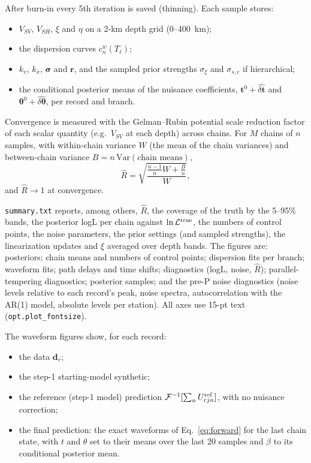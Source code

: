 \documentclass[11pt]{article}
\newcommand{\Ifft}{\mathcal{F}^{-1}}
\newcommand{\vsv}{V_{SV}}
\newcommand{\vsh}{V_{SH}}
\begin{document}
After burn-in every 5th iteration is saved (thinning). Each sample stores:
\begin{itemize}
\item $\vsv$, $\vsh$, $\xi$ and $\eta$ on a 2-km depth grid (0--400~km);
\item the dispersion curves $c^w_n(T_\ell)$;
\item $k_v$, $k_x$, $\bm\sigma$ and $\mathbf{r}$, and the sampled prior
  strengths $\sigma_\xi$ and $\sigma_{s,c}$ if hierarchical;
\item the conditional posterior means of the nuisance coefficients,
  $\mathbf{t}^0+\widehat{\delta\mathbf{t}}$ and
  $\bm\theta^0+\widehat{\delta\bm\theta}$, per record and branch.
\end{itemize}
Convergence is measured with the Gelman--Rubin potential scale reduction
factor of each scalar quantity (e.g.\ $\vsv$ at each depth) across chains.
For $M$ chains of $n$ samples, with within-chain variance $W$ (the mean of
the chain variances) and between-chain variance $B=n\,\mathrm{Var}(\text{chain means})$,
\begin{equation}
 \hat R=\sqrt{\frac{\frac{n-1}{n}W+\frac{B}{n}}{W}},
\end{equation}
and $\hat R\to1$ at convergence.

\texttt{summary.txt} reports, among others, $\hat R$, the coverage of the
truth by the 5--95\% bands, the posterior logL per chain against
$\ln\mathcal{L}^{\rm true}$, the numbers of control points, the noise
parameters, the prior settings (and sampled strengths), the linearization
updates and $\xi$ averaged over depth bands. The figures are: posteriors;
chain means and numbers of control points; dispersion fits per branch;
waveform fits; path delays and time shifts; diagnostics (logL, noise,
$\hat R$); parallel-tempering diagnostics; posterior samples; and the
pre-P noise diagnostics (noise levels relative to each record's peak,
noise spectra, autocorrelation with the AR(1) model, absolute levels per
station). All axes use 15-pt text (\texttt{opt.plot\_fontsize}).

The waveform figures show, for each record:
\begin{itemize}
\item the data $\mathbf{d}_r$;
\item the step-1 starting-model synthetic;
\item the reference (step-1 model) prediction $\Ifft[\sum_nU^{\rm ref}_{rjn}]$,
  with no nuisance correction;
\item the final prediction: the exact waveforms of Eq.~\eqref{eq:forward}
  for the last chain state, with $t$ and $\theta$ set to their means over
  the last 20 samples and $\beta$ to its conditional posterior mean.
\end{itemize}
\end{document}
